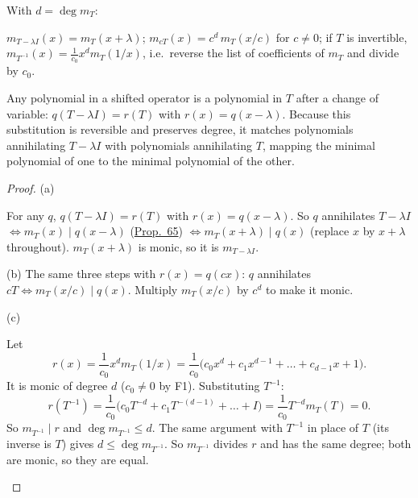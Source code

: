 \documentclass[10pt]{scrartcl}
\begin{document}
\begin{proposition*}\hypertarget{name-f6-shifts-scalings-inverses-hw7-p4-m5}{}\label{name-f6-shifts-scalings-inverses-hw7-p4-m5}
  With $d=\deg m_T$:
  \begin{enumerate}[(a)]
    \ii $m_{T-\lambda I}(x)=m_T(x+\lambda)$;
    \ii $m_{cT}(x)=c^d\,m_T(x/c)$ for $c\ne0$;
    \ii if $T$ is invertible, $m_{T^{-1}}(x)=\frac1{c_0}x^dm_T(1/x)$, i.e.\ reverse the list of coefficients of $m_T$ and divide by $c_0$.
  \end{enumerate}
\end{proposition*}
\begin{ideabox}
Any polynomial in a shifted operator is a polynomial in $T$ after a change of variable: $q(T-\lambda I)=r(T)$ with $r(x)=q(x-\lambda)$. Because this substitution is reversible and preserves degree, it matches polynomials annihilating $T-\lambda I$ with polynomials annihilating $T$, mapping the minimal polynomial of one to the minimal polynomial of the other.
\end{ideabox}
\begin{proof}
  (a)
  \begin{steps}
    \ii For any $q$, $q(T-\lambda I)=r(T)$ with $r(x)=q(x-\lambda)$.
    \ii So $q$ annihilates $T-\lambda I$ $\iff m_T(x)\mid q(x-\lambda)$ (\hyperref[prop-65]{Prop.~65}) $\iff m_T(x+\lambda)\mid q(x)$ (replace $x$ by $x+\lambda$ throughout).
    \ii $m_T(x+\lambda)$ is monic, so it is $m_{T-\lambda I}$.
  \end{steps}
  (b) The same three steps with $r(x)=q(cx)$: $q$ annihilates $cT\iff m_T(x/c)\mid q(x)$. Multiply $m_T(x/c)$ by $c^d$ to make it monic.

  (c)
  \begin{steps}
    \ii Let
    \[ r(x)=\frac1{c_0}x^dm_T(1/x)=\frac1{c_0}\bigl(c_0x^d+c_1x^{d-1}+\dots+c_{d-1}x+1\bigr). \]
    It is monic of degree $d$ ($c_0\ne0$ by F1).
    \ii Substituting $T^{-1}$:
    \[ r(T^{-1})=\frac1{c_0}\bigl(c_0T^{-d}+c_1T^{-(d-1)}+\dots+I\bigr)=\frac1{c_0}T^{-d}m_T(T)=0. \]
    So $m_{T^{-1}}\mid r$ and $\deg m_{T^{-1}}\le d$.
    \ii The same argument with $T^{-1}$ in place of $T$ (its inverse is $T$) gives $d\le\deg m_{T^{-1}}$.
    \ii So $m_{T^{-1}}$ divides $r$ and has the same degree; both are monic, so they are equal.
  \end{steps}
\end{proof}
\end{document}
